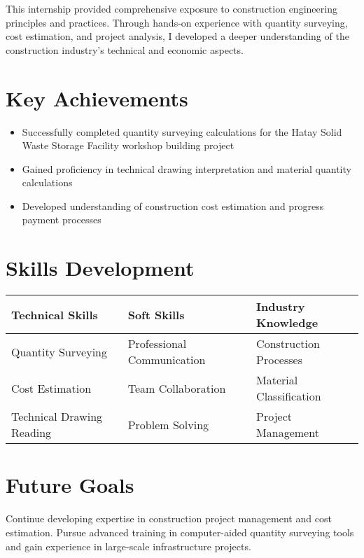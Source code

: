 \documentclass[12pt,a4paper,oneside]{book}
\begin{document}
This internship provided comprehensive exposure to construction engineering principles and practices. Through hands-on experience with quantity surveying, cost estimation, and project analysis, I developed a deeper understanding of the construction industry's technical and economic aspects.

\section*{Key Achievements}
{}

\begin{itemize}
    \item Successfully completed quantity surveying calculations for the Hatay Solid Waste Storage Facility workshop building project
    \item Gained proficiency in technical drawing interpretation and material quantity calculations
    \item Developed understanding of construction cost estimation and progress payment processes
\end{itemize}

\section*{Skills Development}
{}

\begin{tabular}{|p{}|p{}|p{}|}
\hline
\rowcolor{lightgray}
\textbf{Technical Skills} & \textbf{Soft Skills} & \textbf{Industry Knowledge} \\
\hline
Quantity Surveying & Professional Communication & Construction Processes \\
Cost Estimation & Team Collaboration & Material Classification \\
Technical Drawing Reading & Problem Solving & Project Management \\
\hline
\end{tabular}

\section*{Future Goals}
{}

Continue developing expertise in construction project management and cost estimation. Pursue advanced training in computer-aided quantity surveying tools and gain experience in large-scale infrastructure projects.
\end{document}
